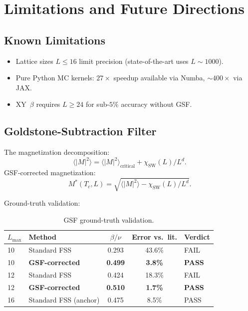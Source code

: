 \documentclass[11pt,a4paper]{article}
\begin{document}
\section{Limitations and Future Directions}\label{sec:limitations}

\subsection{Known Limitations}

\begin{itemize}
  \item Lattice sizes $L \leq 16$ limit precision (state-of-the-art uses $L \sim 1000$).
  \item Pure Python MC kernels: $27\times$ speedup available via Numba, $\sim 400\times$ via JAX.
  \item XY~$\beta$ requires $L \geq 24$ for sub-$5\%$ accuracy without GSF.
\end{itemize}

\subsection{Goldstone-Subtraction Filter}\label{sec:gsf}

The magnetization decomposition:
\begin{equation}\label{eq:mag_decomp}
  \langle|M|^2\rangle = \langle|M|^2\rangle_{\text{critical}} + \chi_{\text{SW}}(L)/L^d.
\end{equation}
GSF-corrected magnetization:
\begin{equation}\label{eq:gsf}
  M^*(T_c, L) = \sqrt{\langle|M|^2\rangle - \chi_{\text{SW}}(L)/L^d}.
\end{equation}

Ground-truth validation:

\begin{table}[ht]
\centering
\caption{GSF ground-truth validation.}
\label{tab:gsf}
\begin{tabular}{@{}llccl@{}}
\toprule
$L_{\max}$ & Method & $\beta/\nu$ & Error vs.\ lit. & Verdict \\
\midrule
10 & Standard FSS & 0.293 & 43.6\% & FAIL \\
10 & \textbf{GSF-corrected} & \textbf{0.499} & \textbf{3.8\%} & \textbf{PASS} \\
12 & Standard FSS & 0.424 & 18.3\% & FAIL \\
12 & \textbf{GSF-corrected} & \textbf{0.510} & \textbf{1.7\%} & \textbf{PASS} \\
16 & Standard FSS (anchor) & 0.475 & 8.5\% & PASS \\
\bottomrule
\end{tabular}
\end{table}
\end{document}
